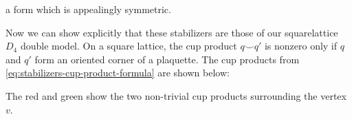 \documentclass{article}
\theoremstyle{definition}
\theoremstyle{definition}
\begin{document}
a form which is appealingly symmetric.

Now we can show explicitly that these stabilizers are those of our squarelattice
$D_4$ double model. On a square lattice, the cup product $q \smile q'$ is nonzero only if $q$ and $q'$
form an oriented corner of a plaquette. The cup products from
\eqref{eq:stabilizers-cup-product-formula}
 are shown below:
 \hspace{1cm}
\begin{center}
  
\end{center}
The red and green show the two non-trivial cup products surrounding the vertex $v$.



\end{document}
